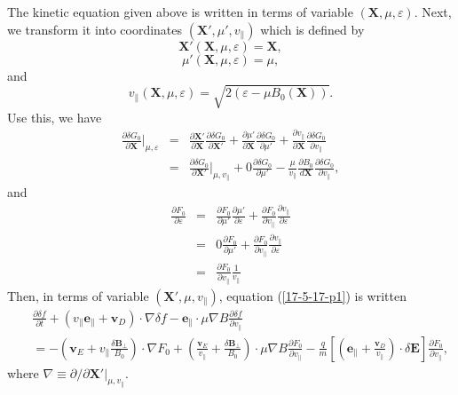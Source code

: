 \documentclass{llncs}
\newcommand{\nobracket}{}
\begin{document}
The kinetic equation given above is written in terms of variable $(\mathbf{X},
\mu, \varepsilon)$. Next, we transform it into coordinates $(\mathbf{X}',
\mu', v_{\parallel})$ which is defined by
\begin{equation}
  \mathbf{X}' (\mathbf{X}, \mu, \varepsilon) =\mathbf{X},
\end{equation}
\begin{equation}
  \mu' (\mathbf{X}, \mu, \varepsilon) = \mu,
\end{equation}
and
\begin{equation}
  v_{\parallel} (\mathbf{X}, \mu, \varepsilon) = \sqrt{2 (\varepsilon - \mu
  B_0 (\mathbf{X}))} .
\end{equation}
Use this, we have
\begin{eqnarray}
  \frac{\partial \delta G_0}{\partial \mathbf{X}} |_{\mu, \varepsilon}
  \nobracket & = & \frac{\partial \mathbf{X}'}{\partial \mathbf{X}} 
  \frac{\partial \delta G_0}{\partial \mathbf{X}'} + \frac{\partial
  \mu'}{\partial \mathbf{X}}  \frac{\partial \delta G_0}{\partial \mu'} +
  \frac{\partial v_{\parallel}}{\partial \mathbf{X}}  \frac{\partial \delta
  G_0}{\partial v_{\parallel}} \nonumber\\
  & = & \frac{\partial \delta G_0}{\partial \mathbf{X}'} |_{\mu,
  v_{\parallel}} \nobracket + 0 \frac{\partial \delta G_0}{\partial \mu'} -
  \frac{\mu}{v_{\parallel}}  \frac{\partial B_0}{d\mathbf{X}} \frac{\partial
  \delta G_0}{\partial v_{\parallel}}, 
\end{eqnarray}
and
\begin{eqnarray}
  \frac{\partial F_0}{\partial \varepsilon} & = & \frac{\partial F_0}{\partial
  \mu'}  \frac{\partial \mu'}{\partial \varepsilon} + \frac{\partial
  F_0}{\partial v_{\parallel}}  \frac{\partial v_{\parallel}}{\partial
  \varepsilon} \nonumber\\
  & = & 0 \frac{\partial F_0}{\partial \mu'} + \frac{\partial F_0}{\partial
  v_{\parallel}}  \frac{\partial v_{\parallel}}{\partial \varepsilon}
  \nonumber\\
  & = & \frac{\partial F_0}{\partial v_{\parallel}}  \frac{1}{v_{\parallel}} 
\end{eqnarray}
Then, in terms of variable $(\mathbf{X}', \mu, v_{\parallel})$, equation
(\ref{17-5-17-p1}) is written
\begin{eqnarray}
  &  & \frac{\partial \delta f}{\partial t} + (v_{\parallel}
  \mathbf{e}_{\parallel} +\mathbf{v}_D) \cdot \nabla \delta f
  -\mathbf{e}_{\parallel} \cdot \mu \nabla B \frac{\partial \delta f}{\partial
  v_{\parallel}} \nonumber\\
  &  & = - \left( \mathbf{v}_E + v_{\parallel} \frac{\delta
  \mathbf{B}_{\perp}}{B_0} \right) \cdot \nabla F_0 + \left(
  \frac{\mathbf{v}_E}{v_{\parallel}} + \frac{\delta \mathbf{B}_{\perp}}{B_0}
  \right) \cdot \mu \nabla B \frac{\partial F_0}{\partial v_{\parallel}} -
  \frac{q}{m} \left[ \left( \mathbf{e}_{\parallel} +
  \frac{\mathbf{v}_D}{v_{\parallel}} \right) \cdot \delta \mathbf{E} \right]
  \frac{\partial F_0}{\partial v_{\parallel}},  \label{17-5-14-e3}
\end{eqnarray}
where $\nabla \equiv \partial / \partial \mathbf{X}' |_{\mu, v_{\parallel}}
\nobracket$.
\end{document}
